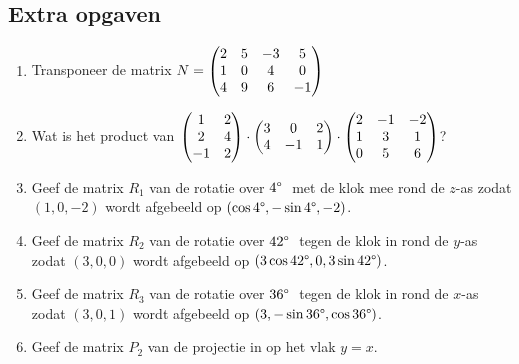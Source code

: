 \subsection{Extra opgaven}
\begin{enumerate}
    \setlength{\itemsep}{10pt}
	\item  Transponeer de matrix $N = \begin{pmatrix} 2&5&-3&5 \\ 1&0&4&0 \\ 4&9&6&-1 \end{pmatrix}$
	
	\item Wat is het product van $\begin{pmatrix} 1&2 \\ 2&4 \\ -1&2 \end{pmatrix} \cdot \begin{pmatrix} 3&0&2 \\ 4&-1&1 \end{pmatrix} \cdot \begin{pmatrix} 2&-1&-2 \\ 1&3&1 \\ 0&5&6 \end{pmatrix}$?
	
	\item Geef de matrix $R_1$ van de rotatie over $4\degree\ $ met de klok mee rond de $z$-as zodat $(1,0,-2)$ wordt afgebeeld op $ (\cos 4\degree , -\sin 4\degree , -2)$.
	
	\item Geef de matrix $R_2$ van de rotatie over $42\degree\ $ tegen de klok in rond de $y$-as zodat $(3,0,0)$ wordt afgebeeld op $ (3\cos 42\degree , 0,  3\sin 42\degree )$.
	
	\item Geef de matrix $R_3$ van de rotatie over $36\degree\ $ tegen de klok in rond de $x$-as zodat $(3,0,1)$ wordt afgebeeld op $ (3, -\sin 36\degree ,  \cos 36\degree )$. 
	
	\item Geef de matrix $P_2$ van de projectie in \RD op het vlak $y=x$.
\end{enumerate}

